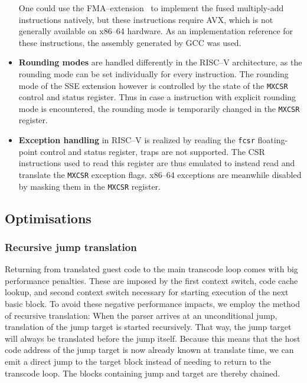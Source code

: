 \begin{itemize}
			One could use the FMA--extension~\cite[S. 141]{intel2017man} to implement the fused multiply-add instructions natively, but these instructions require AVX, which is not generally available on x86--64 hardware.
            As an implementation reference for these instructions, the assembly generated by GCC was used.
    \item \textbf{Rounding modes} are handled differently in the RISC--V architecture, as the rounding mode can be set individually for every instruction.
            The rounding mode of the SSE extension however is controlled by the state of the \texttt{MXCSR} control and status register.
            Thus in case a instruction with explicit rounding mode is encountered, the rounding mode is temporarily changed in the \texttt{MXCSR} register.
    \item \textbf{Exception handling} in RISC--V is realized by reading the \texttt{fcsr} floating-point control and status register, traps are not supported.
            The CSR instructions used to read this register are thus emulated to instead read and translate the \texttt{MXCSR} exception flags.
            x86--64 exceptions are meanwhile disabled by masking them in the \texttt{MXCSR} register.
\end{itemize}


\subsection{Optimisations}
\label{sec:optimise}

\subsubsection{Recursive jump translation}
\label{sec:recursive_translation}
Returning from translated guest code to the main transcode loop comes with big performance penalties.
These are imposed by the first context switch, code cache lookup, and second context switch necessary for starting execution of the next basic block.
To avoid these negative performance impacts, we employ the method of recursive translation: When the parser arrives at an unconditional jump, translation of the jump target is started recursively.
That way, the jump target will always be translated before the jump itself.
Because this means that the host code address of the jump target is now already known at translate time, we can emit a direct jump to the target block instead of needing to return to the transcode loop. %
The blocks containing jump and target are thereby chained.

